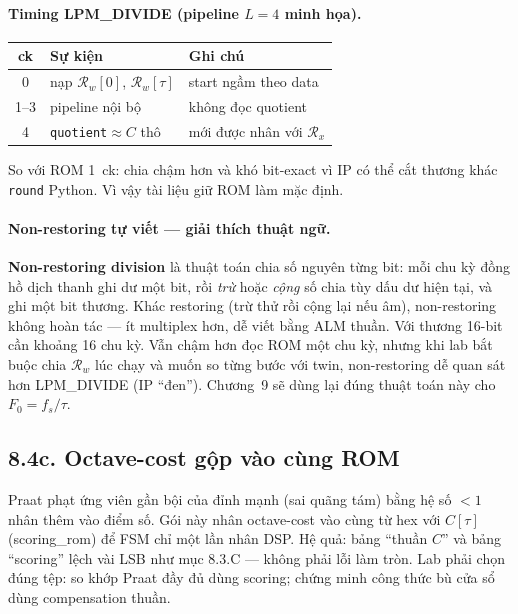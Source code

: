 \paragraph{Timing LPM\_DIVIDE (pipeline $L=4$ minh họa).}
\begin{center}\small
\begin{tabular}{@{}cll@{}}\toprule
ck & Sự kiện & Ghi chú \\
\midrule
0 & nạp $\mathcal{R}_w[0]$, $\mathcal{R}_w[\tau]$ & start ngầm theo data \\
1--3 & pipeline nội bộ & không đọc quotient \\
4 & \texttt{quotient}$\approx C$ thô & mới được nhân với $\mathcal{R}_x$ \\
\bottomrule
\end{tabular}
\end{center}
So với ROM 1~ck: chia chậm hơn và khó bit-exact vì IP có thể cắt thương khác \texttt{round} Python. Vì vậy tài liệu giữ ROM làm mặc định.

\paragraph{Non-restoring tự viết --- giải thích thuật ngữ.}
\textbf{Non-restoring division} là thuật toán chia số nguyên từng bit: mỗi chu kỳ đồng hồ dịch thanh ghi dư một bit, rồi \emph{trừ} hoặc \emph{cộng} số chia tùy dấu dư hiện tại, và ghi một bit thương. Khác restoring (trừ thử rồi cộng lại nếu âm), non-restoring không hoàn tác --- ít multiplex hơn, dễ viết bằng ALM thuần. Với thương 16-bit cần khoảng 16 chu kỳ. Vẫn chậm hơn đọc ROM một chu kỳ, nhưng khi lab bắt buộc chia $\mathcal{R}_w$ lúc chạy và muốn so từng bước với twin, non-restoring dễ quan sát hơn LPM\_DIVIDE (IP ``đen''). Chương~9 sẽ dùng lại đúng thuật toán này cho $F_0=f_s/\tau$.

\subsection*{8.4c. Octave-cost gộp vào cùng ROM}

Praat phạt ứng viên gần bội của đỉnh mạnh (sai quãng tám) bằng hệ số $<1$ nhân thêm vào điểm số. Gói này nhân octave-cost vào cùng từ hex với $C[\tau]$ (scoring\_rom) để FSM chỉ một lần nhân DSP. Hệ quả: bảng ``thuần $C$'' và bảng ``scoring'' lệch vài LSB như mục 8.3.C --- không phải lỗi làm tròn. Lab phải chọn đúng tệp: so khớp Praat đầy đủ dùng scoring; chứng minh công thức bù cửa sổ dùng compensation thuần.

